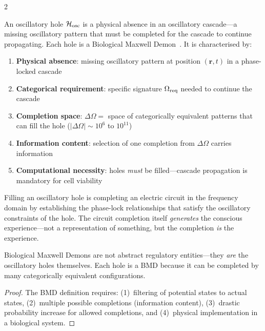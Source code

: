 \begin{multicols}{2}

\begin{definition}
\label{def:osc_hole}
An oscillatory hole $\mathcal{H}_{\text{osc}}$ is a physical absence in an
oscillatory cascade---a missing oscillatory pattern that must be completed
for the cascade to continue propagating.  Each hole is a Biological Maxwell
Demon~\citep{mizraji2021}.  It is characterised by:
\begin{enumerate}
\item \textbf{Physical absence}: missing oscillatory pattern at position
  $(\mathbf{r},t)$ in a phase-locked cascade
\item \textbf{Categorical requirement}: specific signature $\Omega_{\text{req}}$ needed
  to continue the cascade
\item \textbf{Completion space}: $\Delta\Omega = $ space of categorically
  equivalent patterns that can fill the hole
  ($|\Delta\Omega| \sim 10^6$ to $10^{11}$)
\item \textbf{Information content}: selection of one completion from
  $\Delta\Omega$ carries information
\item \textbf{Computational necessity}: holes \emph{must} be filled---cascade
  propagation is mandatory for cell viability
\end{enumerate}
\end{definition}

\begin{definition}
\label{def:circuit_completion}
Filling an oscillatory hole is completing an electric circuit in the
frequency domain by establishing the phase-lock relationships that satisfy
the oscillatory constraints of the hole.  The circuit completion itself
\emph{generates} the conscious experience---not a representation of
something, but the completion \emph{is} the experience.
\end{definition}

\begin{theorem}
\label{thm:bmd_hole_identity}
Biological Maxwell Demons are not abstract regulatory entities---they
\emph{are} the oscillatory holes themselves.  Each hole is a BMD because
it can be completed by many categorically equivalent configurations.
\end{theorem}

\begin{proof}
The BMD definition requires: (1)~filtering of potential states to actual
states, (2)~multiple possible completions (information content),
(3)~drastic probability increase for allowed completions, and
(4)~physical implementation in a biological system.


\end{proof}
\end{multicols}
